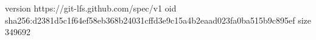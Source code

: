 version https://git-lfs.github.com/spec/v1
oid sha256:d2381d5c1f64ef58eb368b24031cffd3e9c15a4b2eaad023fa0ba515b9c895ef
size 349692

